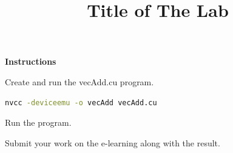 \documentclass[11pt]{article}
\title{Title of The Lab}
\author{}  %
\date{}    %
\begin{document}
  \maketitle

  {\large\textbf{Instructions}}
  \begin{enumerate}
    \setlength\itemsep{0pt}
    \item Create and run the vecAdd.cu program.

\begin{lstlisting}[language=bash]
  nvcc -deviceemu -o vecAdd vecAdd.cu
\end{lstlisting}

    \item Run the program.

    {\color{red}
    \item  Submit your work on the e-learning along with the result.
    }
  \end{enumerate}
\end{document}
